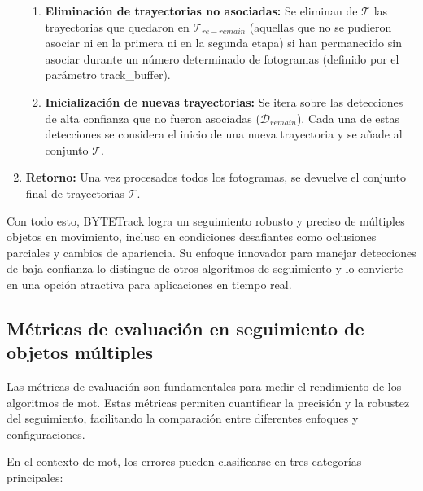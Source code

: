 \documentclass[11pt,spanish,listoffigures,listoftables]{tfgetsinf}
\begin{document}
\begin{enumerate}
{\begin{enumerate}
      \item \textbf{Eliminación de trayectorias no asociadas:} Se eliminan de $\mathcal{T}$ las trayectorias que quedaron en $\mathcal{T}_{re-remain}$ (aquellas que no se pudieron asociar ni en la primera ni en la segunda etapa) si han permanecido sin asociar durante un número determinado de fotogramas (definido por el parámetro track\_buffer).
      \item \textbf{Inicialización de nuevas trayectorias:} Se itera sobre las detecciones de alta confianza que no fueron asociadas ($\mathcal{D}_{remain}$). Cada una de estas detecciones se considera el inicio de una nueva trayectoria y se añade al conjunto $\mathcal{T}$.
   \end{enumerate}
   } %
   \item \textbf{Retorno:} Una vez procesados todos los fotogramas, se devuelve el conjunto final de trayectorias $\mathcal{T}$.
\end{enumerate}

Con todo esto, BYTETrack logra un seguimiento robusto y preciso de múltiples objetos en movimiento, incluso en condiciones desafiantes como oclusiones parciales y cambios de apariencia. Su enfoque innovador para manejar detecciones de baja confianza lo distingue de otros algoritmos de seguimiento y lo convierte en una opción atractiva para aplicaciones en tiempo real.


\subsection{Métricas de evaluación en seguimiento de objetos múltiples} \label{sec:metricas_mot}


Las métricas de evaluación son fundamentales para medir el rendimiento de los algoritmos de \gls{mot}. Estas métricas permiten cuantificar la precisión y la robustez del seguimiento, facilitando la comparación entre diferentes enfoques y configuraciones.

En el contexto de \gls{mot}, los errores pueden clasificarse en tres categorías principales:
\end{document}
